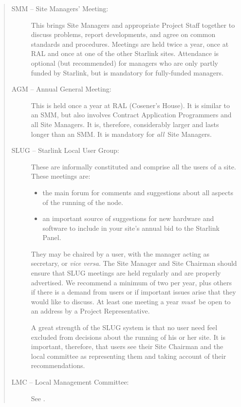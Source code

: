 \begin{quote}
\begin{description}
\item [SMM -- Site Managers' Meeting:]
 This brings Site Managers and appropriate Project Staff together to discuss
 problems, report  developments, and agree on common standards and procedures.
 Meetings are held twice a year, once at RAL and once at one of the other
 Starlink sites.
 Attendance is optional (but recommended) for managers who are only partly
 funded by Starlink, but is mandatory for fully-funded managers.
\item [AGM -- Annual General Meeting:]
 This is held once a year at RAL (Cosener's House).
 It is similar to an SMM, but also involves Contract Application Programmers and
 all Site Managers. 
 It is, therefore, considerably larger and lasts longer than an SMM.
 It is mandatory for {\em all}\, Site Managers.
\item [SLUG -- Starlink Local User Group:]
 These are informally constituted and comprise all the users of a site.
 These meetings are:
 \begin{itemize}
 \item the main forum for comments and suggestions about all aspects of the
  running of the node.
 \item an important source of suggestions for new hardware and software to
  include in your site's annual bid to the Starlink Panel.
 \end{itemize}
 They may be chaired by a user, with the manager acting as secretary, or
 {\it vice versa}.
 The Site Manager and Site Chairman should ensure that SLUG meetings are held
 regularly and are properly advertised.
 We recommend a minimum of two per year, plus others if there is a demand from
 users or if important issues arise that they would like to discuss.
 At least one meeting a year {\em must}\, be open to an address by a Project
 Representative.
 
 A great strength of the SLUG system is that no user need feel excluded from
 decisions about the running of his or her site.
 It is important, therefore, that users see their Site Chairman and the local
 committee as representing them and taking account of their recommendations.

\item [LMC -- Local Management Committee:]
 See .
\end{description}
\end{quote}

